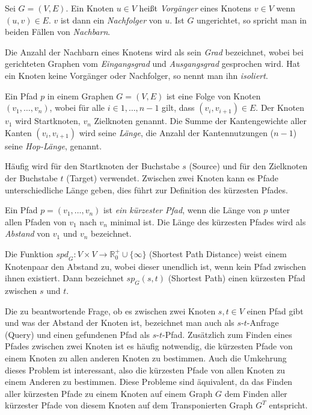 \begin{definition}[Nachbar]
  Sei $G = (V, E)$. Ein Knoten $u \in V$ heißt \emph{Vorgänger} eines Knotens $v \in V$ wenn $(u, v) \in E$. $v$ ist dann ein \emph{Nachfolger} von $u$.
  Ist $G$ ungerichtet, so spricht man in beiden Fällen von \emph{Nachbarn}.
\end{definition}

Die Anzahl der Nachbarn eines Knotens wird als sein \emph{Grad} bezeichnet, wobei bei gerichteten Graphen vom \emph{Eingangsgrad} und \emph{Ausgangsgrad} gesprochen wird.
Hat ein Knoten keine Vorgänger oder Nachfolger, so nennt man ihn \emph{isoliert}.

\begin{definition}[Pfad]
  Ein Pfad $p$ in einem Graphen $G = (V, E)$ ist eine Folge von Knoten $(v_1, \dotsc, v_n)$, wobei für alle $i \in {1, \dotsc, n-1}$ gilt, dass $(v_i, v_{i+1}) \in E$.
  Der Knoten $v_1$ wird Startknoten, $v_n$ Zielknoten genannt.
  Die Summe der Kantengewichte aller Kanten $(v_i, v_{i + 1})$ wird seine \emph{Länge}, die Anzahl der Kantennutzungen ($n - 1$) seine \emph{Hop-Länge}, genannt.
\end{definition}

Häufig wird für den Startknoten der Buchstabe $s$ (Source) und für den Zielknoten der Buchstabe $t$ (Target) verwendet.
Zwischen zwei Knoten kann es Pfade unterschiedliche Länge geben, dies führt zur Definition des kürzesten Pfades.

\begin{definition}
  Ein Pfad $p = (v_1 , \dotsc , v_n)$ ist \emph{ein kürzester Pfad}, wenn die Länge von $p$ unter allen Pfaden von $v_1$ nach $v_n$ minimal ist.
  Die Länge des kürzesten Pfades wird als \emph{Abstand} von $v_1$ und $v_n$ bezeichnet.

  Die Funktion ${spd}_G \colon V \times V \to \mathbb{R}^+_0 \cup \{ \infty \} $ (Shortest Path Distance) weist einem Knotenpaar den Abstand zu, wobei dieser unendlich ist, wenn kein Pfad zwischen ihnen existiert.
  Dann bezeichnet ${sp}_{G} (s, t)$ (Shortest Path) einen kürzesten Pfad zwischen $s$ und $t$.
\end{definition}

Die zu beantwortende Frage, ob es zwischen zwei Knoten $s, t \in V$ einen Pfad gibt und was der Abstand der Knoten ist, bezeichnet man auch als $s$-$t$-Anfrage (Query) und einen gefundenen Pfad als $s$-$t$-Pfad.
Zusätzlich zum Finden eines Pfades zwischen zwei Knoten ist es häufig notwendig, die kürzesten Pfade von einem Knoten zu allen anderen Knoten zu bestimmen.
Auch die Umkehrung dieses Problem ist interessant, also die kürzesten Pfade von allen Knoten zu einem Anderen zu bestimmen.
Diese Probleme sind äquivalent, da das Finden aller kürzesten Pfade zu einem Knoten auf einem Graph $G$ dem Finden aller kürzester Pfade von diesem Knoten auf dem Transponierten Graph $G^T$ entspricht.

